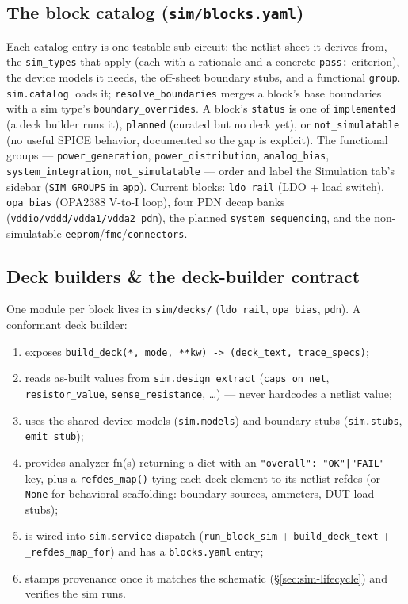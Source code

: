 \documentclass[11pt]{article}
\newcommand{\file}[1]{\texttt{#1}}
\newcommand{\mod}[1]{\texttt{#1}}
\begin{document}
\subsection{The block catalog (\file{sim/blocks.yaml})}
Each catalog entry is one testable sub-circuit: the netlist sheet it derives
from, the \texttt{sim\_types} that apply (each with a rationale and a concrete
\texttt{pass:} criterion), the device models it needs, the off-sheet boundary
stubs, and a functional \texttt{group}. \mod{sim.catalog} loads it;
\texttt{resolve\_boundaries} merges a block's base boundaries with a sim type's
\texttt{boundary\_overrides}. A block's \texttt{status} is one of
\texttt{implemented} (a deck builder runs it), \texttt{planned} (curated but no
deck yet), or \texttt{not\_simulatable} (no useful SPICE behavior, documented so
the gap is explicit). The functional groups --- \texttt{power\_generation},
\texttt{power\_distribution}, \texttt{analog\_bias}, \texttt{system\_integration},
\texttt{not\_simulatable} --- order and label the Simulation tab's sidebar
(\texttt{SIM\_GROUPS} in \mod{app}). Current blocks: \texttt{ldo\_rail} (LDO +
load switch), \texttt{opa\_bias} (OPA2388 V-to-I loop), four PDN decap banks
(\texttt{vddio/vddd/vdda1/vdda2\_pdn}), the planned \texttt{system\_sequencing},
and the non-simulatable \texttt{eeprom}/\texttt{fmc}/\texttt{connectors}.

\subsection{Deck builders \& the deck-builder contract}
One module per block lives in \file{sim/decks/} (\mod{ldo\_rail}, \mod{opa\_bias},
\mod{pdn}). A conformant deck builder:
\begin{enumerate}[leftmargin=1.6em, itemsep=1pt]
  \item exposes \texttt{build\_deck(*, mode, **kw) -> (deck\_text, trace\_specs)};
  \item reads as-built values from \mod{sim.design\_extract}
    (\texttt{caps\_on\_net}, \texttt{resistor\_value}, \texttt{sense\_resistance},
    \dots) --- never hardcodes a netlist value;
  \item uses the shared device models (\mod{sim.models}) and boundary stubs
    (\mod{sim.stubs}, \texttt{emit\_stub});
  \item provides analyzer fn(s) returning a dict with an
    \texttt{"overall": "OK"|"FAIL"} key, plus a \texttt{refdes\_map()} tying each
    deck element to its netlist refdes (or \texttt{None} for behavioral
    scaffolding: boundary sources, ammeters, DUT-load stubs);
  \item is wired into \mod{sim.service} dispatch (\texttt{run\_block\_sim} +
    \texttt{build\_deck\_text} + \texttt{\_refdes\_map\_for}) and has a
    \file{blocks.yaml} entry;
  \item stamps provenance once it matches the schematic
    (\S\ref{sec:sim-lifecycle}) and verifies the sim runs.
\end{enumerate}
\end{document}
